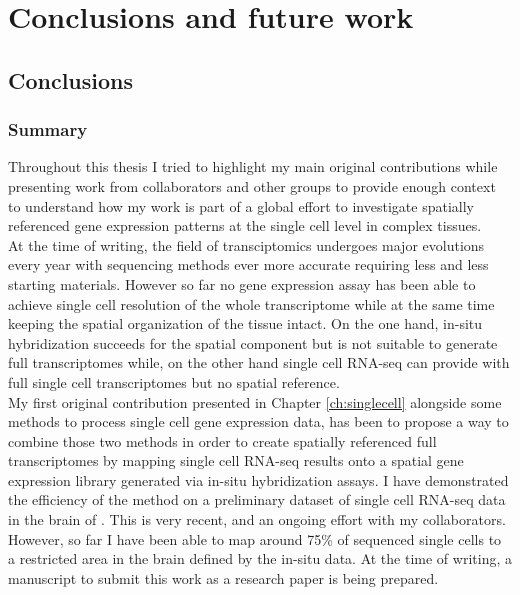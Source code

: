 \chapter{Conclusions and future work}\label{ch:conclusions}

\section{Conclusions}

	\subsection{Summary}
	
Throughout this thesis I tried to highlight my main original contributions while presenting work from collaborators and other groups to provide enough context to understand how my work is part of a global effort to investigate spatially referenced gene expression patterns at the single cell level in complex tissues.\\

At the time of writing, the field of transciptomics undergoes major evolutions every year with sequencing methods ever more accurate requiring less and less starting materials. However so far no gene expression assay has been able to achieve single cell resolution of the whole transcriptome while at the same time keeping the spatial organization of the tissue intact. On the one hand, in-situ hybridization succeeds for the spatial component but is not suitable to generate full transcriptomes while, on the other hand single cell RNA-seq can provide with full single cell transcriptomes but no spatial reference.\\

My first original contribution presented in Chapter \ref{ch:singlecell} alongside some methods to process single cell gene expression data, has been to propose a way to combine those two methods in order to create spatially referenced full transcriptomes by mapping single cell RNA-seq results onto a spatial gene expression library generated via in-situ hybridization assays. I have demonstrated the efficiency of the method on a preliminary dataset of single cell RNA-seq data in the brain of \platy{}. This is very recent, and an ongoing effort with my collaborators. However, so far I have been able to map around 75\% of sequenced single cells to a restricted area in the brain defined by the in-situ data. At the time of writing, a manuscript to submit this work as a research paper is being prepared.\\

